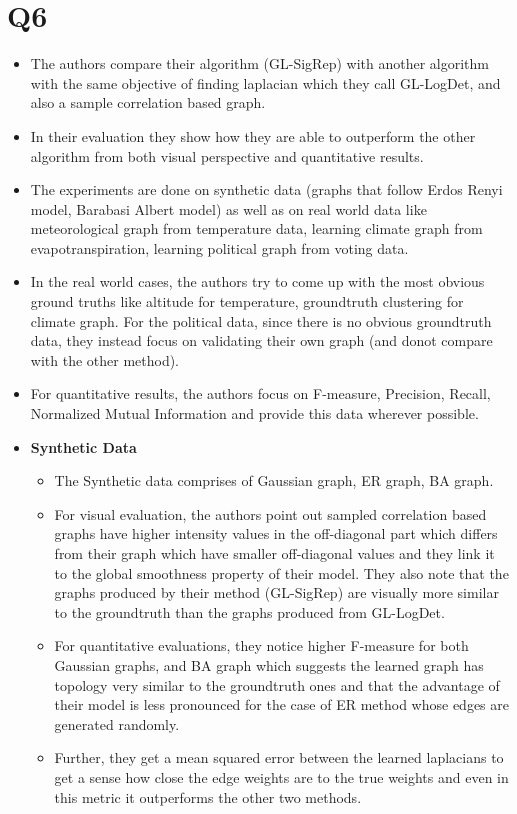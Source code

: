 \documentclass{article}
\begin{document}
\section*{Q6}
\begin{itemize}
\item The authors compare their algorithm (GL-SigRep) with another algorithm with the same objective of finding laplacian which they call GL-LogDet, and also a sample correlation based graph.
\item In their evaluation they show how they are able to outperform the other algorithm from both visual perspective and quantitative results.
\item   The experiments are done on synthetic data (graphs that follow Erdos Renyi model, Barabasi Albert model) as well as on real world data like meteorological graph from temperature data, learning climate graph from evapotranspiration, learning political graph from voting data.
\item In the real world cases, the authors try to come up with the most obvious ground truths like altitude for temperature, groundtruth clustering for climate graph. For the political data, since there is no obvious groundtruth data, they instead focus on validating their own graph (and donot compare with the other method).
\item For quantitative results, the authors focus on F-measure, Precision, Recall, Normalized Mutual Information and provide this data wherever possible.
\item \textbf{Synthetic Data}
  \begin{itemize}
  \item The Synthetic data comprises of Gaussian graph, ER graph, BA graph.
  \item For visual evaluation, the authors point out sampled correlation based graphs have higher intensity values in the off-diagonal part which differs from their graph which have smaller off-diagonal values and they link it to the global smoothness property of their model. They also note that the graphs produced by their method (GL-SigRep) are visually more similar to the groundtruth than the graphs produced from GL-LogDet.
  \item For quantitative evaluations, they notice higher F-measure for both Gaussian graphs, and BA graph which suggests the learned graph has topology very similar to the groundtruth ones and that the advantage of their model is less pronounced for the case of ER method whose edges are generated randomly.
  \item Further, they get a mean squared error between the learned laplacians to get a sense how close the edge weights are to the true weights and even in this metric it outperforms the other two methods.

\end{itemize}
\end{itemize}
\end{document}
